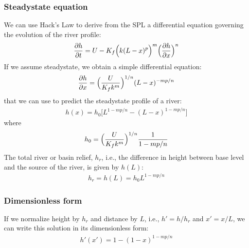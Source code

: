 \documentclass[letterpaper,10pt,english]{jupyterBook}
\begin{document}
\subsubsection{Steady\sphinxhyphen{}state equation}
\label{\detokenize{spl-solution:steady-state-equation}}
\sphinxAtStartPar
We can use Hack’s Law to derive from the SPL a differential equation governing the evolution of the river profile:
\begin{equation*}
\begin{split}\frac{\partial h}{\partial t}= U -K_f\Bigr(k(L-x)^p\Bigr)^m\Bigl(\frac{\partial h}{\partial x}\Bigr)^n\end{split}
\end{equation*}
\sphinxAtStartPar
If we assume steady\sphinxhyphen{}state, we obtain a simple differential equation:
\begin{equation*}
\begin{split}\frac{\partial h}{\partial x}=\Bigl(\frac{U}{K_fk^m}\Bigr)^{1/n}(L-x)^{-mp/n}\end{split}
\end{equation*}
\sphinxAtStartPar
that we can use to predict the steady\sphinxhyphen{}state profile of a river:
\begin{equation}\label{equation:spl-solution:sol-spl}
\begin{split}h(x) = h_0\bigl[L^{1-mp/n}-(L-x)^{1-mp/n}\bigr]\end{split}
\end{equation}
\sphinxAtStartPar
where
\begin{equation*}
\begin{split}h_0=\Bigl(\frac{U}{K_fk^m}\Bigr)^{1/n}\frac{1}{1-mp/n}\end{split}
\end{equation*}
\sphinxAtStartPar
The total river or basin relief, \(h_r\), i.e., the difference in height between base level and the source of the river, is given by \(h(L)\):
\begin{equation*}
\begin{split}h_r=h(L)=h_0L^{1-mp/n}\end{split}
\end{equation*}

\subsubsection{Dimensionless form}
\label{\detokenize{spl-solution:dimensionless-form}}
\sphinxAtStartPar
If we normalize height by \(h_r\) and distance by \(L\), i.e., \(h'=h/h_r\) and \(x'=x/L\), we can write this solution in its dimensionless form:
\begin{equation*}
\begin{split}h'(x')=1-(1-x)^{1-mp/n}\end{split}
\end{equation*}
\end{document}
